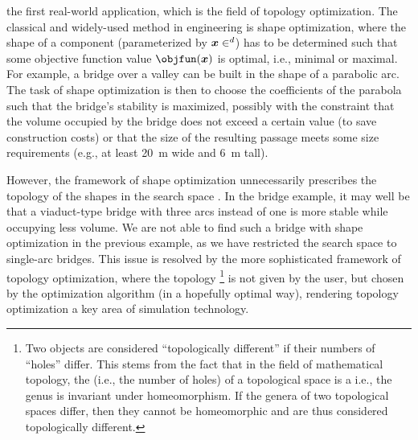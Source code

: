 
\label{chap:60topoOpt}

the first real-world application,
which is the field of topology optimization.
The classical and widely-used method in engineering is shape optimization,
where the shape of a component
(parameterized by $\*x \in \real^d$) has to be
determined such that some objective function value $\objfun(\*x)$ is optimal,
i.e., minimal or maximal.
For example, a bridge over a valley can be built in the shape of a
parabolic arc.
The task of shape optimization is then to choose the coefficients of the
parabola such that the bridge's stability is maximized,
possibly with the constraint that the volume occupied by the bridge
does not exceed a certain value (to save construction costs) or
that the size of the resulting passage meets some size requirements
(e.g., at least \SI{20}{\meter} wide and \SI{6}{\meter} tall).

However, the framework of shape optimization unnecessarily prescribes the
topology of the shapes in the search space \cite{Allaire16Towards}.
In the bridge example, it may well be that a viaduct-type bridge with
three arcs instead of one is more stable while occupying less volume.
We are not able to find such a bridge with shape optimization
in the previous example,
as we have restricted the search space to single-arc bridges.
This issue is resolved by the more sophisticated
framework of topology optimization, where the topology%
\footnote{%
  Two objects are considered ``topologically different''
  if their numbers of ``holes'' differ.
  This stems from the fact that in the field of mathematical topology,
  the  (i.e., the number of holes)
  of a topological space is a  i.e.,
  the genus is invariant under homeomorphism.
  If the genera of two topological spaces differ, then they cannot be
  homeomorphic and are thus considered topologically different.%
}
is not given by the user,
but chosen by the optimization algorithm (in a hopefully optimal way),
rendering topology optimization a key area of simulation technology.

